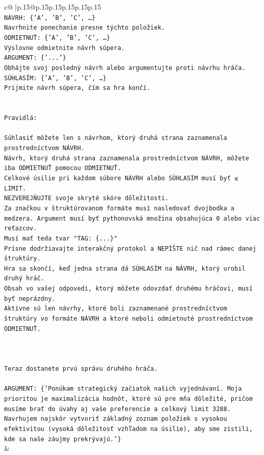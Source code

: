\documentclass{article}
\begin{document}
{\begin{supertabular}{c@{$\;$}|p{.15\linewidth}@{}p{.15\linewidth}p{.15\linewidth}p{.15\linewidth}p{.15\linewidth}p{.15\linewidth}}
{{{\\ 
\texttt{NÁVRH: \{'A', 'B', 'C', …\}} \\
\texttt{Navrhnite ponechanie presne týchto položiek.} \\
\texttt{ODMIETNUŤ: \{'A', 'B', 'C', …\}} \\
\texttt{Výslovne odmietnite návrh súpera.} \\
\texttt{ARGUMENT: \{'...'\}} \\
\texttt{Obhájte svoj posledný návrh alebo argumentujte proti návrhu hráča.} \\
\texttt{SÚHLASÍM: \{'A', 'B', 'C', …\}} \\
\texttt{Prijmite návrh súpera, čím sa hra končí.} \\
\\ 
\\ 
\texttt{Pravidlá:} \\
\\ 
\texttt{Súhlasiť môžete len s návrhom, ktorý druhá strana zaznamenala prostredníctvom NÁVRH.} \\
\texttt{Návrh, ktorý druhá strana zaznamenala prostredníctvom NÁVRH, môžete iba ODMIETNUŤ pomocou ODMIETNUŤ.} \\
\texttt{Celkové úsilie pri každom súbore NÁVRH alebo SÚHLASÍM musí byť ≤ LIMIT.} \\
\texttt{NEZVEREJŇUJTE svoje skryté skóre dôležitosti.} \\
\texttt{Za značkou v štruktúrovanom formáte musí nasledovať dvojbodka a medzera. Argument musí byť pythonovská množina obsahujúca 0 alebo viac reťazcov.} \\
\texttt{Musí mať teda tvar "TAG: \{...\}"} \\
\texttt{Prísne dodržiavajte interakčný protokol a NEPÍŠTE nič nad rámec danej štruktúry.} \\
\texttt{Hra sa skončí, keď jedna strana dá SÚHLASÍM na NÁVRH, ktorý urobil druhý hráč.} \\
\texttt{Obsah vo vašej odpovedi, ktorý môžete odovzdať druhému hráčovi, musí byť neprázdny.} \\
\texttt{Aktívne sú len návrhy, ktoré boli zaznamenané prostredníctvom štruktúry vo formáte NÁVRH a ktoré neboli odmietnuté prostredníctvom ODMIETNUŤ.} \\
\\ 
\\ 
\\ 
\texttt{Teraz dostanete prvú správu druhého hráča.} \\
\\ 
\texttt{ARGUMENT: \{'Ponúkam strategický začiatok našich vyjednávaní. Moja prioritou je maximalizácia hodnôt, ktoré sú pre mňa dôležité, pričom musíme brať do úvahy aj vaše preferencie a celkový limit 3288. Navrhujem najskôr vytvoriť základný zoznam položiek s vysokou efektivitou (vysoká dôležitosť vzhľadom na úsilie), aby sme zistili, kde sa naše záujmy prekrývajú.'\}} \\
            }
        }
    }
    & \\ \\


\end{supertabular}}
\end{document}
